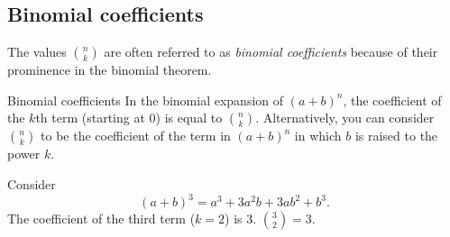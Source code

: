 \pagebreak
\subsection{Binomial coefficients}
The values ${n \choose k}$ are often referred to as \emph{binomial coefficients} because of their prominence in the binomial theorem.
\begin{bdef}{Binomial coefficients}
    In the binomial expansion of $(a+b)^n$, the coefficient of the $k$th term (starting at $0$) is equal to $\displaystyle {n \choose k}$. Alternatively, you can consider ${n \choose k}$ to be the coefficient of the term in $(a+b)^n$ in which $b$ is raised to the power $k$.
\end{bdef}

\begin{changebar}
    \begin{example}
        Consider \[
            (a + b)^3 = a^3 + 3a^2b + 3ab^2 + b^3.    
            \] The coefficient of the third term ($k = 2$) is $3$. ${3 \choose 2} = 3$.
        \end{example}
    \end{changebar}

